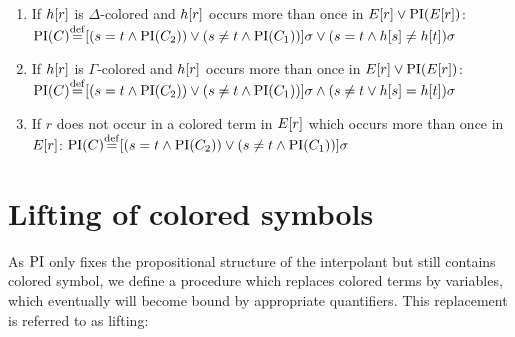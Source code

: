 \begin{defi}
\begin{itemize}
\begin{enumerate}
				\item If $h[r]$ is $\Delta$-colored and $h[r]$ occurs more than once in $E[r] \lor \operatorname{PI}(E[r])$:
					\label{def:PI_paramod_1}
					\newline
					$\PI(C) \defeq{} [ ( s=t \land \PI(C_2) ) \lor (s\neq t \land \PI(C_1)) ]\sigma \lor (s=t \land h\occur{s} \neq      h\occur{t})\sigma$
				\item If $h[r]$ is $\Gamma$-colored and $h[r]$ occurs more than once in $E[r] \lor \operatorname{PI}(E[r])$:
					\label{def:PI_paramod_2}
					\newline
					$\PI(C) \defeq{} [ ( s=t \land \PI(C_2) ) \lor (s\neq t \land \PI(C_1)) ]\sigma \land (s\neq t \lor h\occur{s} =     h\occur{t})\sigma$
				\item If $r$ does not occur in a colored term in $E[r]$ which occurs more than once in\nolinebreak{} $E[r]$:
					\label{def:PI_paramod_3}
					\newline
					$\PI(C) \defeq{} [ ( s=t \land \PI(C_2) ) \lor (s\neq t \land \PI(C_1)) ]\sigma$ \qedhere

			\end{enumerate}

	\end{itemize}
\end{defi}




\section{Lifting of colored symbols}
\label{sec:lifting}
As $\operatorname{PI}$ only fixes the propositional structure of the interpolant but still contains colored symbol, 
we define a procedure which replaces colored terms by variables, which eventually will become bound by appropriate quantifiers.
This replacement is referred to as lifting:



